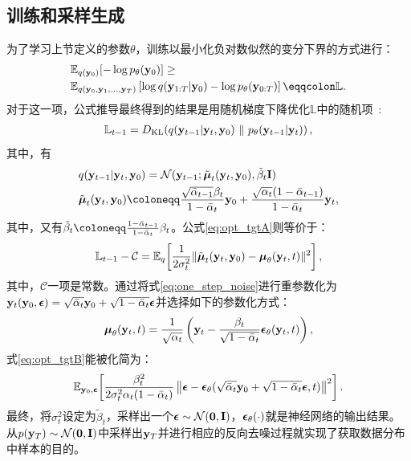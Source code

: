 \subsection{训练和采样生成}
为了学习上节定义的参数$\theta$，训练以最小化负对数似然的变分下界的方式进行：
\begin{equation}
\begin{split}
& \mathbb{E}_{q(\by_0)}[-\log p_\theta(\by_0)] \geq \\
& \mathbb{E}_{q(\by_0, \by_1, \ldots, \by_T)}\left[\log q(\by_{1:T} | \by_0) - \log p_\theta(\by_{0:T})\right] \eqqcolon \mathbb{L}.
\end{split}
\end{equation}
对于这一项，公式推导最终得到的结果是用随机梯度下降优化$\mathbb{L}$中的随机项~\citep{Ho2020ddpm}:
\begin{align}
\mathbb{L}_{t-1} = D_{\mathrm{KL}}\!\left(q(\mathbf{y}_{t-1}|\mathbf{y}_t,\mathbf{y}_0) ~ \| ~ p_\theta(\mathbf{y}_{t-1}|\mathbf{y}_t)\right), \label{eq:opt_tgtA}
\end{align}
其中，有
\begin{align}
&q(\by_{t-1}|\by_t,\by_0) = \mathcal{N}(\by_{t-1}; \tilde\bmu_t(\by_t, \by_0), \tilde\beta_t \bI)\\
&\tilde\bmu_t(\by_t, \by_0) \defeq \frac{\sqrt{\bar\alpha_{t-1}}\beta_t }{1-\bar\alpha_t}\by_0 + \frac{\sqrt{\alpha_t}(1- \bar\alpha_{t-1})}{1-\bar\alpha_t} \by_t,
\end{align}
其中，又有$\tilde\beta_t \defeq \frac{1-\bar\alpha_{t-1}}{1-\bar\alpha_t}\beta_t$。公式\eqref{eq:opt_tgtA}则等价于：
\begin{align}
  \mathbb{L}_{t-1} - \mathcal{C}
   = \mathbb{E}_{q}\!\left[ \frac{1}{2\sigma_t^2} \|\tilde{{\boldsymbol{\mu}}}_t(\mathbf{y}_t,\mathbf{y}_0) - {\boldsymbol{\mu}}_\theta(\mathbf{y}_t, t)\|^2 \right], \label{eq:opt_tgtB}
\end{align}
其中，$\mathcal{C}$一项是常数。通过将式\eqref{eq:one_step_noise}进行重参数化为$\mathbf{y}_t(\mathbf{y}_0, {\boldsymbol{\epsilon}}) = \sqrt{\bar\alpha_t}\mathbf{y}_0 + \sqrt{1-\bar\alpha_t}{\boldsymbol{\epsilon}}$并选择如下的参数化方式：
\begin{equation} \label{eq:mu_parameterization}
    {\boldsymbol{\mu}}_\theta(\mathbf{y}_t, t) = \frac{1}{\sqrt{\alpha_t}}\left( \mathbf{y}_t - \frac{\beta_t}{\sqrt{1-\bar\alpha_t}} {\boldsymbol{\epsilon}}_\theta(\mathbf{y}_t, t) \right),
\end{equation}
式\eqref{eq:opt_tgtB}能被化简为：
\begin{align}
    \mathbb{E}_{\mathbf{y}_0, {\boldsymbol{\epsilon}}}\!\left[ \frac{\beta_t^2}{2\sigma_t^2 \alpha_t (1-\bar\alpha_t)}  \left\| {\boldsymbol{\epsilon}} - {\boldsymbol{\epsilon}}_\theta(\sqrt{\bar\alpha_t} \mathbf{y}_0 + \sqrt{1-\bar\alpha_t}{\boldsymbol{\epsilon}}, t) \right\|^2\right]. \label{eq:opt_tgtC}
\end{align}
最终，将$\sigma_t^2$设定为$\tilde\beta_t$，采样出一个${\boldsymbol{\epsilon}}\sim\mathcal{N}(\mathbf{0},\mathbf{I})$，${\boldsymbol{\epsilon}}_\theta(\cdot)$就是神经网络的输出结果。
从$p(\mathbf{y}_T) \sim \mathcal{N}(\mathbf{0}, \mathbf{I})$中采样出$\mathbf{y}_T$并进行相应的反向去噪过程就实现了获取数据分布中样本的目的。
